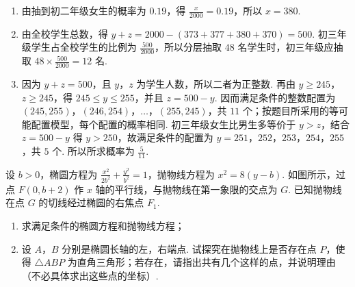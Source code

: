 \begin{solution}
\begin{enumerate}
\item 由抽到初二年级女生的概率为 \(0.19\)，得 \(\frac{x}{2000}=0.19\)，所以 \(x=380\).

\item 由全校学生总数，得 \(y+z=2000-(373+377+380+370)=500\). 初三年级学生占全校学生的比例为 \(\frac{500}{2000}\)，所以分层抽取 \(48\) 名学生时，初三年级应抽取 \(48\times\frac{500}{2000}=12\) 名.

\item 因为 \(y+z=500\)，且 \(y\)，\(z\) 为学生人数，所以二者为正整数. 再由 \(y\geqslant245\)，\(z\geqslant245\)，得 \(245\leqslant y\leqslant255\)，并且 \(z=500-y\). 因而满足条件的整数配置为
\((245,255)\)，\((246,254)\)，\(\ldots\)，\((255,245)\)，共 \(11\) 个；按题目所采用的等可能配置模型，每个配置的概率相同. 初三年级女生比男生多等价于 \(y>z\)，结合 \(z=500-y\) 得 \(y>250\)，故满足条件的配置为 \(y=251\)，\(252\)，\(253\)，\(254\)，\(255\)，共 \(5\) 个. 所以所求概率为 \(\frac5{11}\).
\end{enumerate}
\end{solution}

\begin{problem}
设 \(b > 0\)，椭圆方程为 \(\frac{x^2}{2b^2} + \frac{y^2}{b^2} = 1\)，抛物线方程为 \(x^2 = 8(y - b)\). 如图所示，过点 \(F(0, b + 2)\) 作 \(x\) 轴的平行线，与抛物线在第一象限的交点为 \(G\). 已知抛物线在点 \(G\) 的切线经过椭圆的右焦点 \(F_1\).

\begin{enumerate}
\item 求满足条件的椭圆方程和抛物线方程；
\item 设 \(A\)，\(B\) 分别是椭圆长轴的左，右端点. 试探究在抛物线上是否存在点 \(P\)，使得 \(\triangle ABP\) 为直角三角形；若存在，请指出共有几个这样的点，并说明理由（不必具体求出这些点的坐标）.
\end{enumerate}

\end{problem}

